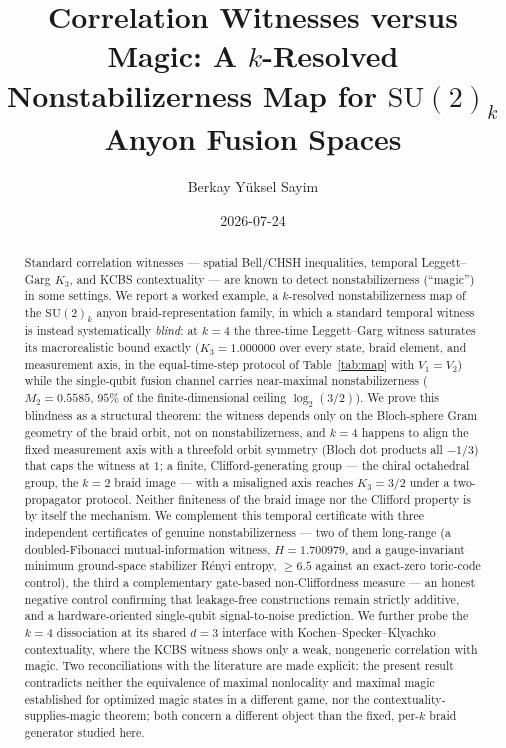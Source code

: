 \documentclass[aps,pra,twocolumn,superscriptaddress,longbibliography,floatfix,nofootinbib]{revtex4-2}
\begin{document}
\setcounter{secnumdepth}{3}

\title{Correlation Witnesses versus Magic: A $k$-Resolved Nonstabilizerness Map for $\mathrm{SU}(2)_k$ Anyon Fusion Spaces}

\author{Berkay Y\"uksel Sayim}

\date{2026-07-24}

\begin{abstract}
Standard correlation witnesses --- spatial Bell/CHSH inequalities,
temporal Leggett--Garg $K_3$, and KCBS contextuality --- are known to
detect nonstabilizerness (``magic'') in some settings. We report a
worked example, a $k$-resolved nonstabilizerness map of the
$\mathrm{SU}(2)_k$ anyon braid-representation family, in which a
standard temporal witness is instead systematically \emph{blind}: at
$k=4$ the three-time Leggett--Garg witness saturates its
macrorealistic bound exactly ($K_3=1.000000$ over every state, braid
element, and measurement axis, in the equal-time-step protocol of
Table~\ref{tab:map} with $V_1{=}V_2$) while the single-qubit fusion channel
carries near-maximal nonstabilizerness ($M_2=0.5585$, $95\%$ of the
finite-dimensional ceiling $\log_2(3/2)$). We prove this blindness as
a structural theorem: the witness depends only on the Bloch-sphere
Gram geometry of the braid orbit, not on nonstabilizerness, and $k=4$
happens to align the fixed measurement axis with a threefold orbit
symmetry (Bloch dot products all $-1/3$) that caps the witness at
$1$; a finite, Clifford-generating group --- the chiral octahedral
group, the $k{=}2$ braid image --- with a misaligned axis reaches
$K_3=3/2$ under a two-propagator protocol. Neither finiteness of the braid image nor the
Clifford property is by itself the mechanism. We complement this
temporal certificate with three independent certificates of genuine
nonstabilizerness --- two of them long-range (a doubled-Fibonacci
mutual-information witness, $H=1.700979$, and a gauge-invariant minimum
ground-space stabilizer Rényi entropy, $\geq6.5$ against an exact-zero
toric-code control), the third a complementary gate-based
non-Cliffordness measure --- an honest negative
control confirming that leakage-free constructions remain strictly
additive, and a hardware-oriented single-qubit signal-to-noise
prediction. We further probe the $k=4$ dissociation at its shared $d=3$ interface with
Kochen--Specker--Klyachko contextuality, where the KCBS witness shows only a weak, nongeneric
correlation with magic. Two reconciliations with the literature are made explicit: the present result contradicts
neither the equivalence of maximal nonlocality and maximal magic established for optimized magic
states in a different game, nor the contextuality-supplies-magic theorem; both concern a
different object than the fixed, per-$k$ braid generator studied here.
\end{abstract}
\end{document}

